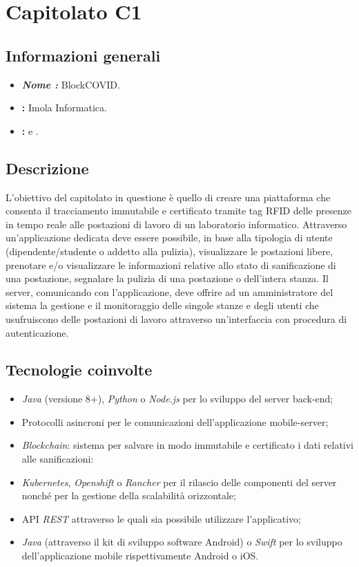 \section{Capitolato C1}

\subsection{Informazioni generali}{
\begin{itemize}
\item \textbf{\emph{Nome :}} BlockCOVID.
\item \textbf{\commitProg:} Imola Informatica.
\item \textbf{\proponProg:} \VT{} e \CR.
\end{itemize}
}

\subsection{Descrizione}{
L'obiettivo del capitolato in questione è quello di creare una piattaforma che consenta il tracciamento immutabile e certificato tramite tag RFID delle presenze in tempo reale alle postazioni di lavoro di un laboratorio informatico. Attraverso un'applicazione dedicata deve essere possibile, in base alla tipologia di utente (dipendente/studente o addetto alla pulizia), visualizzare le postazioni libere, prenotare e/o visualizzare le informazioni relative allo stato di sanificazione di una postazione, segnalare la pulizia di una postazione o dell'intera stanza. Il server, comunicando con l'applicazione, deve offrire ad un amministratore del sistema la gestione e il monitoraggio delle singole stanze e degli utenti che usufruiscono delle postazioni di lavoro attraverso un'interfaccia con procedura di autenticazione.

}

\subsection{Tecnologie coinvolte}{
\begin{itemize}
\item \textit{Java} (versione 8+), \textit{Python} o \textit{Node.js} per lo sviluppo del server back-end;
\item Protocolli asincroni per le comunicazioni dell'applicazione mobile-server;
\item \textit{Blockchain}: sistema per salvare in modo immutabile e certificato i dati relativi alle sanificazioni:
\item \textit{Kubernetes}, \textit{Openshift} o \textit{Rancher} per il rilascio delle componenti
del server nonché per la gestione della scalabilità orizzontale;
\item API \textit{REST} attraverso le quali sia possibile utilizzare l'applicativo;
\item \textit{Java} (attraverso il kit di sviluppo software Android) o \textit{Swift} per lo sviluppo dell'applicazione mobile rispettivamente Android o iOS.
\end{itemize}
}

